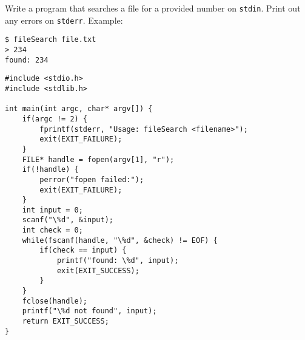 Write a program that searches a file for a provided number on \texttt{stdin}.
Print out any errors on \texttt{stderr}.
Example:

\begin{lstlisting}
$ fileSearch file.txt
> 234
found: 234
\end{lstlisting}

\begin{answer}
\begin{lstlisting}
#include <stdio.h>
#include <stdlib.h>

int main(int argc, char* argv[]) {
	if(argc != 2) {
		fprintf(stderr, "Usage: fileSearch <filename>");
		exit(EXIT_FAILURE);
	}
	FILE* handle = fopen(argv[1], "r");
	if(!handle) {
		perror("fopen failed:");
		exit(EXIT_FAILURE);
	}
	int input = 0;
	scanf("\%d", &input);
	int check = 0;
	while(fscanf(handle, "\%d", &check) != EOF) {
		if(check == input) {
			printf("found: \%d", input);
			exit(EXIT_SUCCESS);
		}
	}
	fclose(handle);
	printf("\%d not found", input);
	return EXIT_SUCCESS;
}
\end{lstlisting}
\end{answer}
